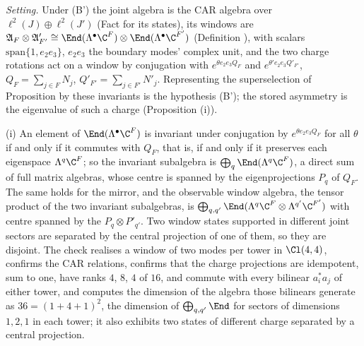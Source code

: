 \emph{Setting.} Under (B') the joint algebra is the CAR algebra over $\ell^{2}(J) \oplus \ell^{2}(J')$ (Fact  for its states), its windows are $\mathfrak{A}_{F} \otimes \mathfrak{A}'_{F'} \cong \End(\Lambda^{\bullet}\C^{F}) \otimes \End(\Lambda^{\bullet}\C^{F'})$ (Definition ), with scalars $\mathrm{span}\{1, e_{2}e_{3}\}$, $e_{2}e_{3}$ the boundary modes' complex unit, and the two charge rotations act on a window by conjugation with $e^{\theta e_{2}e_{3}Q_{F}}$ and $e^{\theta' e_{2}e_{3}Q'_{F'}}$, $Q_{F} = \sum_{j \in F}N_{j}$, $Q'_{F'} = \sum_{j \in F'}N'_{j}$. Representing the superselection of Proposition  by these invariants is the hypothesis (B'); the stored asymmetry is the eigenvalue of such a charge (Proposition (i)).

(i) An element of $\End(\Lambda^{\bullet}\C^{F})$ is invariant under conjugation by $e^{\theta e_{2}e_{3}Q_{F}}$ for all $\theta$ if and only if it commutes with $Q_{F}$, that is, if and only if it preserves each eigenspace $\Lambda^{q}\C^{F}$; so the invariant subalgebra is $\bigoplus_{q}\End(\Lambda^{q}\C^{F})$, a direct sum of full matrix algebras, whose centre is spanned by the eigenprojections $P_{q}$ of $Q_{F}$. The same holds for the mirror, and the observable window algebra, the tensor product of the two invariant subalgebras, is $\bigoplus_{q, q'}\End(\Lambda^{q}\C^{F} \otimes \Lambda^{q'}\C^{F'})$ with centre spanned by the $P_{q} \otimes P'_{q'}$. Two window states supported in different joint sectors are separated by the central projection of one of them, so they are disjoint. The check realises a window of two modes per tower in $\Cl(4,4)$, confirms the CAR relations, confirms that the charge projections are idempotent, sum to one, have ranks $4$, $8$, $4$ of $16$, and commute with every bilinear $a^{*}_{i}a_{j}$ of either tower, and computes the dimension of the algebra those bilinears generate as $36 = (1 + 4 + 1)^{2}$, the dimension of $\bigoplus_{q,q'}\End$ for sectors of dimensions $1, 2, 1$ in each tower; it also exhibits two states of different charge separated by a central projection.

